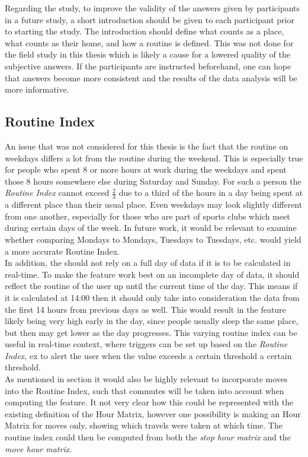Regarding the study, to improve the validity of the answers given by participants in a future study, a short introduction should be given to each participant prior to starting the study. The introduction should define what counts as a place, what counts as their home, and how a routine is defined. This was not done for the field study in this thesis which is likely a cause for a lowered quality of the subjective answers. If the participants are instructed beforehand, one can hope that answers become more consistent and the results of the data analysis will be more informative.

\subsection{Routine Index}
An issue that was not considered for this thesis is the fact that the routine on weekdays differs a lot from the routine during the weekend. This is especially true for people who spent 8 or more hours at work during the weekdays and spent those 8 hours somewhere else during Saturday and Sunday. For such a person the \textit{Routine Index} cannot exceed $\frac{2}{3}$ due to a third of the hours in a day being spent at a different place than their usual place. Even weekdays may look slightly different from one another, especially for those who are part of sports clubs which meet during certain days of the week. In future work, it would be relevant to examine whether comparing Mondays to Mondays, Tuesdays to Tuesdays, etc. would yield a more accurate Routine Index.\\

In addition, the  should not rely on a full day of data if it is to be calculated in real-time. To make the feature work best on an incomplete day of data, it should reflect the routine of the user up until the current time of the day. This means if it is calculated at 14:00 then it should only take into consideration the data from the first 14 hours from previous days as well. This would result in the feature likely being very high early in the day, since people usually sleep the same place, but then may get lower as the day progresses. This varying routine index can be useful in real-time context, where triggers can be set up based on the \textit{Routine Index}, ex to alert the user when the value exceeds a certain threshold a certain threshold.\\

As mentioned in section \label{sub:routine-index} it would also be highly relevant to incorporate moves into the Routine Index, such that commutes will be taken into account when computing the feature. It not very clear how this could be represented with the existing definition of the Hour Matrix, however one possibility is making an Hour Matrix for moves only, showing which travels were taken at which time. The routine index could then be computed from both the \textit{stop hour matrix} and the \textit{move hour matrix}.

